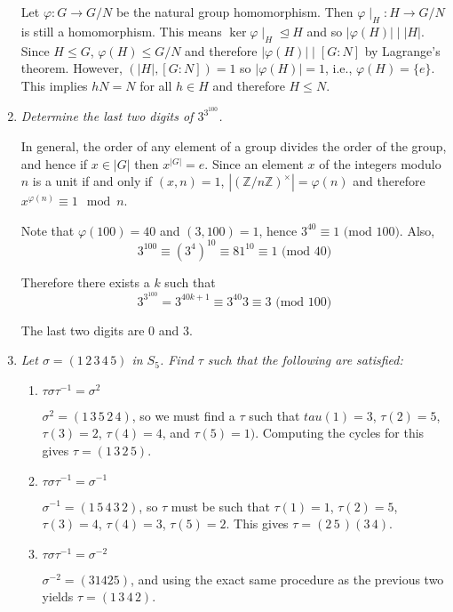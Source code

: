 \documentclass[letterpaper, 11pt]{article}
\begin{document}
\begin{enumerate}
Let $\varphi: G \rightarrow G/N$ be the natural group homomorphism.  Then $\varphi \mid_{H}:H \rightarrow G/N$ is still a homomorphism.  This means $\ker \varphi \mid_{H} \unlhd H$ and so $|\varphi(H)| \mid |H|$.  Since $H \leq G$, $\varphi(H) \leq G/N$ and therefore $|\varphi(H)| \mid [G:N]$ by Lagrange's theorem.  However, $(|H|, [G:N]) = 1$ so $|\varphi(H)| = 1$, i.e., $\varphi(H) = \{e\}$.  This implies $hN = N$ for all $h \in H$ and therefore $H \leq N$.

\item \emph{Determine the last two digits of $3^{3^{100}}$.}

In general, the order of any element of a group divides the order of the group, and hence if $x \in |G|$ then $x^{|G|} = e$.  Since an element $x$ of the integers modulo $n$ is a unit if and only if $(x,n)=1$, $\left|(\mathbb{Z}/n\mathbb{Z})^{\times}\right| = \varphi(n)$ and therefore $x^{\varphi(n)} \equiv 1 \mod n$.

Note that $\varphi(100) = 40$ and $(3,100) = 1$, hence $3^{40} \equiv 1 \mbox{ (mod $100$)}$.  Also, $$3^{100} \equiv (3^4)^{10} \equiv 81^{10} \equiv 1 \mbox{ (mod $40$)}$$

Therefore there exists a $k$ such that $$3^{3^{100}} = 3^{40k + 1} \equiv 3^{40}3 \equiv 3 \mbox{ (mod $100$)}$$

The last two digits are $0$ and $3$.
\item \emph{Let $\sigma = (1\,2\,3\,4\,5)$ in $S_5$.  Find $\tau$ such that the following are satisfied:}
\begin{enumerate}
\item \emph{$\tau\sigma\tau^{-1} = \sigma^2$}

$\sigma^2 = (1\,3\,5\,2\,4)$, so we must find a $\tau$ such that $tau(1)=3$, $\tau(2)=5$, $\tau(3)=2$, $\tau(4)=4$, and $\tau(5)=1)$.  Computing the cycles for this gives $\tau = (1\,3\,2\,5)$.

\item \emph{$\tau\sigma\tau^{-1} = \sigma^{-1}$}

$\sigma^{-1} = (1\,5\,4\,3\,2)$, so $\tau$ must be such that $\tau(1)=1$, $\tau(2) = 5$, $\tau(3)=4$, $\tau(4) = 3$, $\tau(5)=2$.  This gives $\tau = (2\,5\,)(3\,4)$.

\item \emph{$\tau\sigma\tau^{-1} = \sigma^{-2}$}

$\sigma^{-2} = (31425)$, and using the exact same procedure as the previous two yields $\tau=(1\,3\,4\,2)$.
\end{enumerate}


\end{enumerate}
\end{document}
